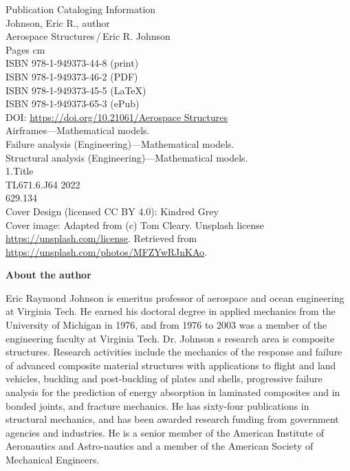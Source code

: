 \documentclass{AeroStructure-ERJohnson}
\begin{document}
\begin{copyrt}
Publication Cataloging Information\\
Johnson, Eric R., author\\
\hspace*{1em}Aerospace Structures\,/\,Eric R. Johnson\\
\hspace*{1em}Pages cm\\
\hspace*{1em}ISBN 978-1-949373-44-8 (print)\\
\hspace*{1em}ISBN 978-1-949373-46-2 (PDF)\\
\hspace*{1em}ISBN 978-1-949373-45-5 (LaTeX)\\
\hspace*{1em}ISBN 978-1-949373-65-3 (ePub)\\
\hspace*{1em}DOI: \url{https://doi.org/10.21061/Aerospace Structures}\\
\hspace*{2em}Airframes---Mathematical models.\\
\hspace*{2em}Failure analysis (Engineering)---Mathematical models.\\
\hspace*{2em}Structural analysis (Engineering)---Mathematical
models.\\
1.\hspace{24pt}Title\\
\phantom{1.}\hspace{24pt}TL671.6.J64 2022\\
\phantom{1.}\hspace{24pt}629.134\\
Cover Design (licensed CC BY 4.0): Kindred Grey\\
Cover image: Adapted from (c) Tom Cleary. Unsplash license
\url{https://unsplash.com/license}. Retrieved from\\
\url{https://unsplash.com/photos/MFZYwRJnKAo}.

\enlargethispage{2\baselineskip}

\textbf{About the author}\\
{\raggedright Eric Raymond Johnson is emeritus professor of aerospace and ocean engineering at Virginia Tech. He earned his doctoral degree in applied mechanics from the University of Michigan in 1976, and from 1976 to 2003 was a member of the engineering faculty at Virginia Tech. Dr. Johnson s research area is composite structures. Research activities include the mechanics of the response and failure of advanced composite material structures with applications to flight and land vehicles, buckling and post-buckling of plates and shells, progressive failure analysis for the prediction of energy absorption in laminated composites and in bonded joints, and fracture mechanics. He has sixty-four publications in structural mechanics, and has been awarded research funding from government agencies and industries. He is a senior member of the American Institute of Aeronautics and Astro-nautics and a member of the American Society of Mechanical Engineers.\par}
\end{copyrt}
\end{document}
